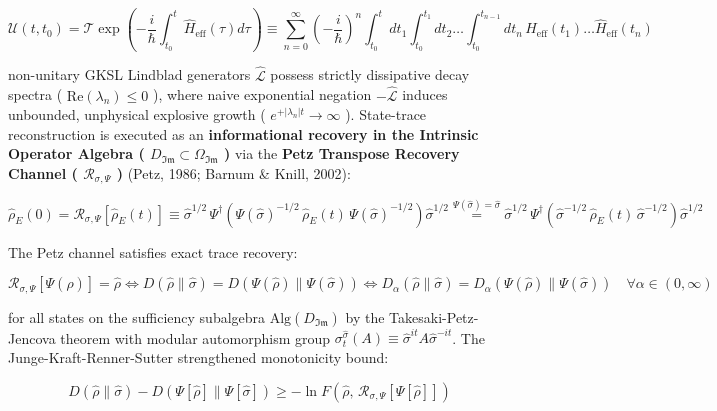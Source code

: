\documentclass[11pt,a4paper]{article}
\theoremstyle{definition}
\theoremstyle{remark}
\begin{document}
\begin{equation}
\mathcal{U}(t, t_0) = \mathcal{T} \exp\left(-\frac{i}{\hbar}\int_{t_0}^t \hat{H}_{\text{eff}}(\tau)d\tau\right) \equiv \sum_{n=0}^\infty \left(-\frac{i}{\hbar}\right)^n \int_{t_0}^t dt_1 \int_{t_0}^{t_1} dt_2 \dots \int_{t_0}^{t_{n-1}} dt_n \, \hat{H}_{\text{eff}}(t_1)\dots\hat{H}_{\text{eff}}(t_n)
\end{equation}


non-unitary GKSL Lindblad generators $\hat{\mathcal{L}}$ possess strictly dissipative decay spectra ( $\mathrm{Re}(\lambda_n) \le 0$ ), where naive exponential negation $-\hat{\mathcal{L}}$ induces unbounded, unphysical explosive growth ( $e^{+|\lambda_n|t} \to \infty$ ). State-trace reconstruction is executed as an \textbf{informational recovery in the Intrinsic Operator Algebra ( $D_{\mathfrak{Im}} \subset \Omega_{\mathfrak{Im}}$ )} via the \textbf{Petz Transpose Recovery Channel ( $\mathcal{R}_{\sigma, \Psi}$ )} (Petz, 1986; Barnum \& Knill, 2002):


\begin{equation}
\boxed{\hat{\rho}_E(0) = \mathcal{R}_{\sigma, \Psi}[ \hat{\rho}_E(t) ] \equiv \hat{\sigma}^{1/2} \, \Psi^\dagger\left( \Psi(\hat{\sigma})^{-1/2} \, \hat{\rho}_E(t) \, \Psi(\hat{\sigma})^{-1/2} \right) \hat{\sigma}^{1/2} \overset{\Psi(\hat{\sigma})=\hat{\sigma}}{=} \hat{\sigma}^{1/2} \, \Psi^\dagger\left( \hat{\sigma}^{-1/2} \, \hat{\rho}_E(t) \, \hat{\sigma}^{-1/2} \right) \hat{\sigma}^{1/2}}
\end{equation}


The Petz channel satisfies exact trace recovery:


\begin{equation}
\mathcal{R}_{\sigma, \Psi}[\Psi(\hat{\rho})] = \hat{\rho} \iff D(\hat{\rho} \parallel \hat{\sigma}) = D(\Psi(\hat{\rho}) \parallel \Psi(\hat{\sigma})) \iff D_\alpha(\hat{\rho} \parallel \hat{\sigma}) = D_\alpha(\Psi(\hat{\rho}) \parallel \Psi(\hat{\sigma})) \quad \forall \alpha \in (0, \infty)
\end{equation}


for all states on the sufficiency subalgebra $\mathrm{Alg}(D_{\mathfrak{Im}})$ by the Takesaki-Petz-Jencova theorem with modular automorphism group $\sigma_t^{\hat{\sigma}}(A) \equiv \hat{\sigma}^{it} A \hat{\sigma}^{-it}$. The Junge-Kraft-Renner-Sutter strengthened monotonicity bound:


\begin{equation}
D(\hat{\rho} \parallel \hat{\sigma}) - D(\Psi[\hat{\rho}] \parallel \Psi[\hat{\sigma}]) \ge -\ln F\left(\hat{\rho}, \, \mathcal{R}_{\sigma, \Psi}[\Psi[\hat{\rho}]]\right)
\end{equation}
\end{document}
